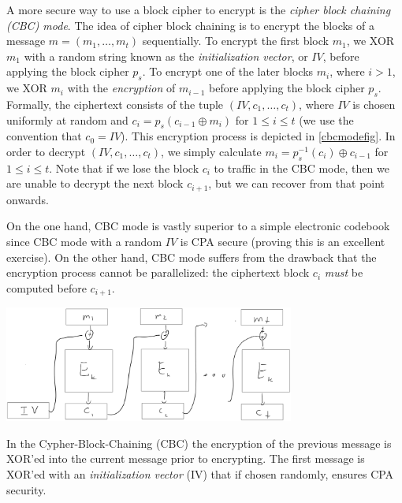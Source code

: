 A more secure way to use a block cipher to encrypt is the \emph{cipher
block chaining (CBC) mode}. The idea of cipher block chaining is to
encrypt the blocks of a message \(m = (m_1, \ldots, m_t)\) sequentially.
To encrypt the first block \(m_1\), we XOR \(m_1\) with a random string
known as the \emph{initialization vector}, or
\(\ensuremath{\mathit{IV}}\), before applying the block cipher \(p_s\).
To encrypt one of the later blocks \(m_i\), where \(i > 1\), we XOR
\(m_i\) with the \emph{encryption} of \(m_{i-1}\) before applying the
block cipher \(p_s\). Formally, the ciphertext consists of the tuple
\((\ensuremath{\mathit{IV}}, c_1, \ldots, c_t)\), where
\(\ensuremath{\mathit{IV}}\) is chosen uniformly at random and
\(c_i = p_s(c_{i-1} \oplus m_i)\) for \(1 \le i \le t\) (we use the
convention that \(c_0 = \ensuremath{\mathit{IV}}\)). This encryption
process is depicted in \cref{cbcmodefig}. In order to decrypt
\((\ensuremath{\mathit{IV}}, c_1, \ldots, c_t)\), we simply calculate
\(m_i = p_s^{-1}(c_i) \oplus c_{i-1}\) for \(1 \le i \le t\). Note that
if we lose the block \(c_i\) to traffic in the CBC mode, then we are
unable to decrypt the next block \(c_{i+1}\), but we can recover from
that point onwards.

On the one hand, CBC mode is vastly superior to a simple electronic
codebook since CBC mode with a random \(\ensuremath{\mathit{IV}}\) is
CPA secure (proving this is an excellent exercise). On the other hand,
CBC mode suffers from the drawback that the encryption process cannot be
parallelized: the ciphertext block \(c_i\) \emph{must} be computed
before \(c_{i+1}\).

\begin{marginfigure}
\centering
\includegraphics[width=\linewidth, height=1.5in, keepaspectratio]{../figure/cbc-mode.jpg}
\caption{In the Cypher-Block-Chaining (CBC) the encryption of the
previous message is XOR'ed into the current message prior to encrypting.
The first message is XOR'ed with an \emph{initialization vector} (IV)
that if chosen randomly, ensures CPA security.}
\label{cbcmodefig}
\end{marginfigure}

